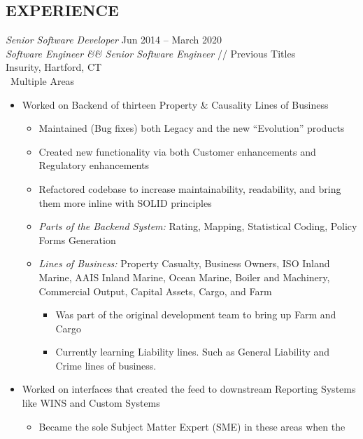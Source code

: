 \documentclass[margin]{res}
\begin{document}
\begin{resume}
   \section{EXPERIENCE} 
   {\sl Senior Software Developer} \hfill Jun 2014 -- March 2020 \\
   {\sl Software Engineer \&\& Senior Software Engineer} \hfill // Previous Titles \\
   Insurity, Hartford, CT\\\
   Multiple Areas
   \begin{itemize}  %
      \item Worked on Backend of thirteen Property \& Causality Lines of Business
      \begin{itemize}
      	 \item Maintained (Bug fixes) both Legacy and the new ``Evolution'' products
      	 \item Created new functionality via both Customer enhancements and \\
      	    Regulatory enhancements
      	 \item Refactored codebase to increase maintainability, readability, 
      	    and bring them more inline with SOLID principles
      	 \item {\sl Parts of the Backend System:} Rating, Mapping, Statistical Coding, 
      	    Policy Forms Generation
      	 \item {\sl Lines of Business:} Property Casualty, Business Owners, ISO Inland \\
      	     Marine, AAIS Inland Marine, Ocean Marine, Boiler and Machinery, \\
      	     Commercial Output, Capital Assets, Cargo, and Farm
      	     \begin{itemize}
      	        \item Was part of the original development team to bring up Farm and 
      	           Cargo
      	        \item Currently learning Liability lines. Such as General Liability and Crime 
                     lines of business.
      	     \end{itemize}
      \end{itemize}
      \item Worked on interfaces that created the feed to downstream Reporting 
         Systems like WINS and Custom Systems
         \begin{itemize}
            \item Became the sole Subject Matter Expert (SME) in these areas when the 

\end{itemize}
\end{itemize}
\end{resume}
\end{document}

